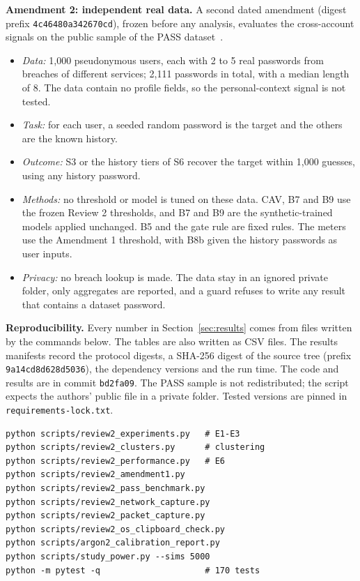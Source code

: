 \documentclass[conference]{IEEEtran}
\begin{document}
\textbf{Amendment 2: independent real data.} A second dated amendment (digest prefix \texttt{4c46480a342670cd}), frozen before any analysis, evaluates the cross-account signals on the public sample of the PASS dataset~\cite{pass}.
\begin{itemize}
\item \emph{Data:} 1,000 pseudonymous users, each with 2 to 5 real passwords from breaches of different services; 2,111 passwords in total, with a median length of 8. The data contain no profile fields, so the personal-context signal is not tested.
\item \emph{Task:} for each user, a seeded random password is the target and the others are the known history.
\item \emph{Outcome:} S3 or the history tiers of S6 recover the target within 1,000 guesses, using any history password.
\item \emph{Methods:} no threshold or model is tuned on these data. CAV, B7 and B9 use the frozen Review 2 thresholds, and B7 and B9 are the synthetic-trained models applied unchanged. B5 and the gate rule are fixed rules. The meters use the Amendment 1 threshold, with B8b given the history passwords as user inputs.
\item \emph{Privacy:} no breach lookup is made. The data stay in an ignored private folder, only aggregates are reported, and a guard refuses to write any result that contains a dataset password.
\end{itemize}

\textbf{Reproducibility.} Every number in Section~\ref{sec:results} comes from files written by the commands below. The tables are also written as CSV files. The results manifests record the protocol digests, a SHA-256 digest of the source tree (prefix \texttt{9a14cd8d628d5036}), the dependency versions and the run time. The code and results are in commit \texttt{bd2fa09}. The PASS sample is not redistributed; the script expects the authors' public file in a private folder. Tested versions are pinned in \texttt{requirements-lock.txt}.
{\footnotesize
\begin{verbatim}
python scripts/review2_experiments.py   # E1-E3
python scripts/review2_clusters.py      # clustering
python scripts/review2_performance.py   # E6
python scripts/review2_amendment1.py
python scripts/review2_pass_benchmark.py
python scripts/review2_network_capture.py
python scripts/review2_packet_capture.py
python scripts/review2_os_clipboard_check.py
python scripts/argon2_calibration_report.py
python scripts/study_power.py --sims 5000
python -m pytest -q                     # 170 tests
\end{verbatim}}
\end{document}
